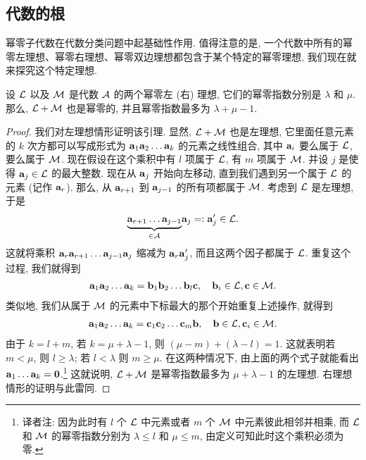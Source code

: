 \documentclass[lang=cn,zihao=-4,twoside,fontset=none]{textbook}
\newcommand{\lt}{<}
\newcommand{\undernote}[2]{\underset{#1}{\underbrace{#2}}}
\def\eq#1{\[\begin{aligned}{}#1\end{aligned}\]}
\newcommand{\bfnull}{\mathbf{0}}
\begin{document}
\subsection{代数的根}\label{sec:3.5.1}

幂零子代数在代数分类问题中起基础性作用. 值得注意的是, 一个代数中所有的幂零左理想、幂零右理想、幂零双边理想都包含于某个特定的幂零理想, 我们现在就来探究这个特定理想.

\begin{lem}
    \label{lma:3.5.5}%
    设 ${\mathcal L}$ 以及 ${\mathcal M}$ 是代数 ${\mathcal A}$ 的两个幂零左 (右) 理想, 它们的幂零指数分别是 $\lambda$ 和 $\mu$. 那么, ${\mathcal L}+{\mathcal M}$ 也是幂零的, 并且幂零指数最多为 $\lambda+\mu-1$.
\end{lem}

\begin{proof}
    我们对左理想情形证明该引理. 显然, ${\mathcal L}+{\mathcal M}$ 也是左理想, 它里面任意元素的 $k$ 次方都可以写成形式为 ${\mathbf a}_1{\mathbf a}_2\dots{\mathbf a}_k$ 的元素之线性组合, 其中 ${\mathbf a}_i$ 要么属于 ${\mathcal L}$, 要么属于 ${\mathcal M}$. 现在假设在这个乘积中有 $l$ 项属于 ${\mathcal L}$, 有 $m$ 项属于 ${\mathcal M}$. 并设 $j$ 是使得 ${\mathbf a}_j\in{\mathcal L}$ 的最大整数. 现在从 ${\mathbf a}_j$ 开始向左移动, 直到我们遇到另一个属于 ${\mathcal L}$ 的元素 (记作 ${\mathbf a}_r$). 那么, 从 ${\mathbf a}_{r+1}$ 到 ${\mathbf a}_{j-1}$ 的所有项都属于 ${\mathcal M}$. 考虑到 ${\mathcal L}$ 是左理想, 于是 
    \eq{
        \undernote{\in\mA}{\bfa_{r+1}\dots\bfa_{j-1}}\bfa_{j}=: \bfa_j'\in\mL. 
    }
    这就将乘积 ${\mathbf a}_r{\mathbf a}_{r+1}\dots{\mathbf a}_{j-1}{\mathbf a}_j$ 缩减为 ${\mathbf a}_r{\mathbf a}_j'$, 而且这两个因子都属于 ${\mathcal L}$. 重复这个过程, 我们就得到 
    \eq{
        \bfa_1\bfa_2\dots\bfa_k=\bfb_1\bfb_2\dots\bfb_l\bfc, \quad \bfb_i\in\mL, \bfc\in\mM.
    }
    类似地, 我们从属于 ${\mathcal M}$ 的元素中下标最大的那个开始重复上述操作, 就得到 
    \eq{
        \bfa_1\bfa_2\dots\bfa_k=\bfc_1\bfc_2\dots\bfc_m\bfb, \quad \bfb\in\mL,\bfc_i\in\mM.
    }
    由于 $k=l+m$, 若 $k=\mu+\lambda-1$, 则 $(\mu-m)+(\lambda-l)=1$. 这就表明若 $m\lt\mu$, 则 $l\geq\lambda$; 若 $l\lt\lambda$ 则 $m\geq\mu$. 在这两种情况下, 由上面的两个式子就能看出 $\bfa_1\dots\bfa_k=\bfnull$.\footnote{译者注: 因为此时有 $l$ 个 ${\mathcal L}$ 中元素或者 $m$ 个 ${\mathcal M}$ 中元素彼此相邻并相乘, 而 ${\mathcal L}$ 和 ${\mathcal M}$ 的幂零指数分别为 $\lambda\leq l$ 和 $\mu\leq m$, 由定义可知此时这个乘积必须为零.} 这就说明, ${\mathcal L}+{\mathcal M}$ 是幂零指数最多为 $\mu+\lambda-1$ 的左理想. 右理想情形的证明与此雷同.
\end{proof}
\end{document}

